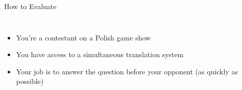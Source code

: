 \documentclass[compress]{beamer}
\begin{document}
\begin{frame}{How to Evaluate}

  \begin{columns}
    \begin{itemize}
    \item You're a contestant on a Polish game show
    \item You have access to a simultaneous translation system
    \item Your job is to answer the question before your opponent (as
      quickly as possible)
    \end{itemize}
  \end{columns}

\end{frame}
\end{document}
